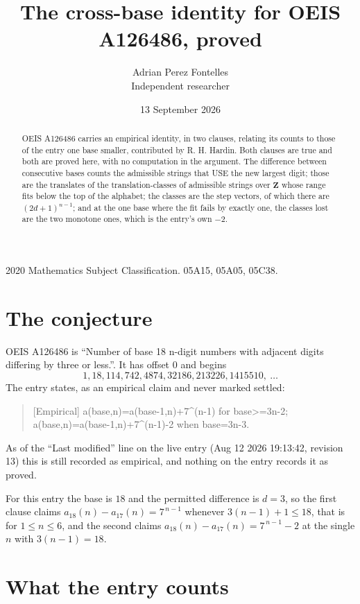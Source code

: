 \documentclass[11pt,a4paper]{article}
\title{The cross-base identity for OEIS A126486, proved}
\author{Adrian Perez Fontelles\\ \small Independent researcher}
\date{13 September 2026}
\theoremstyle{plain}
\theoremstyle{definition}
\begin{document}
\maketitle

\begin{abstract}
OEIS A126486 carries an empirical identity, in two clauses, relating its counts to those of the
entry one base smaller, contributed by R. H. Hardin. Both clauses are true and both are proved
here, with no computation in the argument. The difference between consecutive bases counts the
admissible strings that USE the new largest digit; those are the translates of the
translation-classes of admissible strings over $\mathbf{Z}$ whose range fits below the top of
the alphabet; the classes are the step vectors, of which there are $(2d+1)^{n-1}$; and at the
one base where the fit fails by exactly one, the classes lost are the two monotone ones, which
is the entry's own $-2$.
\end{abstract}

\noindent\small 2020 Mathematics Subject Classification. 05A15, 05A05, 05C38.\normalsize

\section{The conjecture}

OEIS A126486 is ``Number of base 18 n-digit numbers with adjacent digits differing by three or less.''. It has offset $0$ and begins
\[
1, 18, 114, 742, 4874, 32186, 213226, 1415510,\ \dots
\]
The entry states, as an empirical claim and never marked settled:
\begin{quote}
[Empirical] a(base,n)=a(base-1,n)+7\textasciicircum{}(n-1) for base>=3n-2; a(base,n)=a(base-1,n)+7\textasciicircum{}(n-1)-2 when base=3n-3.
\end{quote}
As of the ``Last modified'' line on the live entry (Aug 12 2026 19:13:42, revision 13)
this is still recorded as empirical, and nothing on the entry records it as proved.

For this entry the base is $18$ and the permitted difference is $d=3$, so the first clause
claims $a_{18}(n)-a_{17}(n)=7^{\,n-1}$ whenever $3(n-1)+1\le18$, that is for
$1\le n\le6$, and the second claims $a_{18}(n)-a_{17}(n)=7^{\,n-1}-2$ at the single
$n$ with $3(n-1)=18$.

\section{What the entry counts}
\end{document}
